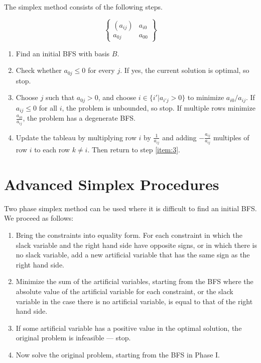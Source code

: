 \begin{defn}
  \label{sec:simplex-method-1}
  The simplex method consists of the following steps.

  \begin{equation}
    \label{eq:4}
    \begin{Bmatrix}
      (a_{ij}) & a_{i0} \\
      a_{0j} & a_{00}
    \end{Bmatrix}
  \end{equation}

  \begin{enumerate}
  \item\label{item:2} Find an initial BFS with basis $B$.
  \item\label{item:3} Check whether $a_{0j} \leq 0$ for every $j$.  If yes, the
    current solution is optimal, so stop.
  \item\label{item:4} Choose $j$ such that $a_{0j} > 0$, and choose $i \in \{ i' |
    a_{i'j} > 0 \} $ to minimize $a_{i0} / a_{ij}$.  If $a_{ij} \leq
    0$ for all $i$, the problem is unbounded, so stop.  If multiple
    rows minimize $\frac{a_{i0}}{a_{ij}}$, the problem has a
    degenerate BFS.
  \item\label{item:5} Update the tableau by multiplying row $i$ by
    $\frac{1}{a_{ij}}$ and adding $-\frac{a_{ij}}{a_{ij}}$ multiples
    of row $i$ to each row $k \neq i$. Then return to step \ref{item:3}.
  \end{enumerate}
\end{defn}



\section{Advanced Simplex Procedures}
\label{sec:advanc-simpl-proc}

\begin{defn}
  \label{sec:advanc-simpl-proc-1}
  Two phase simplex method can be used where it is difficult to find
  an initial BFS.  We proceed as follows:

  \begin{enumerate}
  \item Bring the constraints into equality form.  For each constraint
    in which the slack variable and the right hand side have opposite
    signs, or in which there is no slack variable, add a new
    artificial variable that has the same sign as the right hand side.
  \item Minimize the sum of the artificial variables, starting from
    the BFS where the absolute value of the artificial variable for
    each constraint, or the slack variable in the case there is no
    artificial variable, is equal to that of the right hand side.
  \item If some artificial variable has a positive value in the
    optimal solution, the original problem is infeasible --- stop.
  \item Now solve the original problem, starting from the BFS in Phase I.
  \end{enumerate}
\end{defn}


